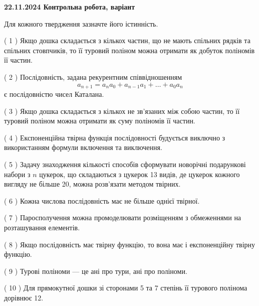 \documentclass[12pt, ukrainian]{article}
\begin{document}
\vspace{4mm}
\newpage
\begin {large}

\textbf{22.11.2024 Контрольна робота, варіант  }\par


{
Для кожного твердження зазначте його істинність.\par
\vspace{2mm}
( 1 ) Якщо дошка складається з кількох частин, що не мають спільних рядків та спільних стовпчиків, то її туровий поліном можна отримати як добуток поліномів її частин.%

( 2 ) Послідовність, задана рекурентним співвідношенням $$a_{n+1}=a_{n}a_{0}+a_{n-1}a_{1}+\ldots+a_0a_{n}$$ є послідовністю чисел Каталана.%

( 3 ) Якщо дошка складається з кількох не зв’язаних між собою частин, то її туровий поліном можна отримати як суму поліномів її частин.%

( 4 ) Експоненційна твірна функція послідовності будується виключно з використанням формули включення та виключення.%

( 5 ) Задачу знаходження кількості способів сформувати новорічні подарункові набори з $n$ цукерок, що складаються з цукерок 13 видів, де цукерок кожного вигляду не більше 20, можна розв’язати методом твірних.%

( 6 ) Кожна числова послідовність має не більше однієї твірної.%

( 7 ) Паросполучення можна промоделювати розміщенням з обмеженнями на розташування елементів.%

( 8 ) Якщо послідовність має твірну функцію, то вона має і експоненційну твірну функцію.%

( 9 ) Турові поліноми --- це ані про тури, ані про поліноми.%

( 10 ) Для прямокутної дошки зі сторонами 5 та 7 степінь її турового полінома дорівнює 12.%


\vspace{5mm}
}
\end {large}
\end{document}
